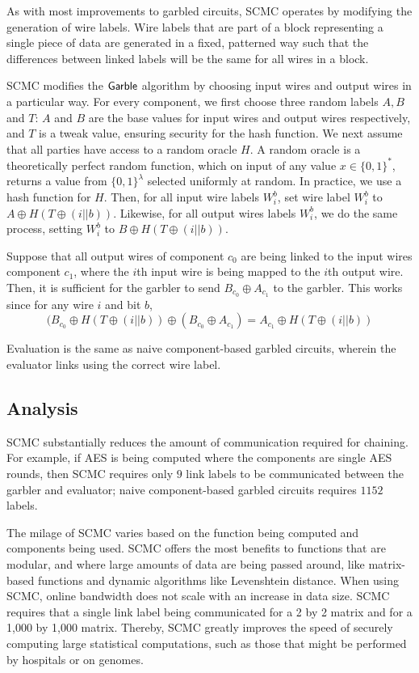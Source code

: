 As with most improvements to garbled circuits, SCMC operates by modifying the generation of wire labels. 
Wire labels that are part of a block representing a single piece of data are generated in a fixed, patterned way such that the differences between linked labels will be the same for all wires in a block. 

SCMC modifies the $\sf{Garble}$ algorithm by choosing input wires and output wires in a particular way. 
For every component, we first choose three random labels $A,B$ and $T$: $A$ and $B$ are the base values for input wires and output wires respectively, and $T$ is a tweak value, ensuring security for the hash function.
We next assume that all parties have access to a random oracle $H$. 
A random oracle is a theoretically perfect random function, which on input of any value $x \in \{0,1\}^*$, returns a value from $\{0,1\}^{\lambda}$ selected uniformly at random.
In practice, we use a hash function for $H$. 
Then, for all input wire labels $W_i^b$, set wire label $W_i^b$ to $A \oplus H(T \oplus (i || b))$. 
Likewise, for all output wires labels $W_i^b$, we do the same process, setting $W_i^b$ to $B \oplus H(T \oplus (i || b))$.

Suppose that all output wires of component $c_0$ are being linked to the input wires component $c_1$, where the $i$th input wire is being mapped to the $i$th output wire. 
Then, it is sufficient for the garbler to send $B_{c_0} \oplus A_{c_1}$ to the garbler. 
This works since for any wire $i$ and bit $b$,
\begin{equation}
(B_{c_0} \oplus H(T \oplus (i || b)) \oplus (B_{c_0} \oplus A_{c_1}) = A_{c_1} \oplus H(T \oplus (i || b))
\end{equation}

Evaluation is the same as naive component-based garbled circuits, wherein the evaluator links using the correct wire label.

\subsection{Analysis}
SCMC substantially reduces the amount of communication required for chaining. 
For example, if AES is being computed where the components are single AES rounds, then SCMC requires only $9$ link labels to be communicated between the garbler and evaluator; naive component-based garbled circuits requires $1152$ labels. 

The milage of SCMC varies based on the function being computed and components being used. 
SCMC offers the most benefits to functions that are modular, and where large amounts of data are being passed around, like matrix-based functions and dynamic algorithms like Levenshtein distance. 
When using SCMC, online bandwidth does not scale with an increase in data size. 
SCMC requires that a single link label being communicated for a 2 by 2 matrix and for a 1,000 by 1,000 matrix. 
Thereby, SCMC greatly improves the speed of securely computing large statistical computations, such as those that might be performed by hospitals or on genomes. 


